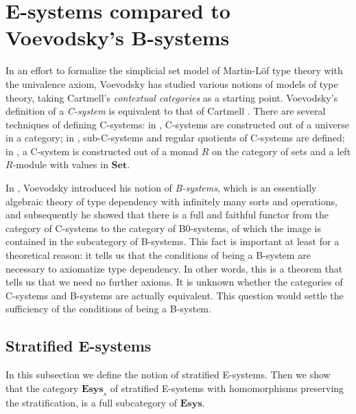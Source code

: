 \section{E-systems compared to Voevodsky's B-systems}\label{sec:esys_compared}
In an effort to formalize the simplicial set model of Martin-L\"of type theory
with the univalence axiom, Voevodsky has studied various notions of models of
type theory, taking Cartmell's \emph{contextual categories} as a starting
point. Voevodsky's definition of a \emph{C-system} is equivalent to that of Cartmell
\cite{VV_C-systems_quotients}. There are several techniques of defining 
C-systems: in \cite{VV_Csys_univ}, C-systems are constructed out of a universe
in a category; in \cite{VV_C-systems_quotients}, sub-C-systems and regular
quotients of C-systems are defined; in \cite{VV_C-systems_monad}, a C-system
is constructed out of a monad $R$ on the category of sets and a left $R$-module
with values in $\mathbf{Set}$. 

In \cite{VV_B-systems}, Voevodsky introduced his notion of \emph{B-systems}, which is
an essentially algebraic theory of type dependency with infinitely many sorts 
and operations, and subsequently he showed that there is a full and faithful
functor from the category of C-systems to the category of B0-systems, of which
the image is contained in the subcategory of B-systems. This fact is important at least
for a theoretical reason: it tells us that the conditions of being a B-system
are necessary to axiomatize type dependency. In other words,
this is a theorem that tells us that we need no further axioms. It is
unknown whether the categories of C-systems and B-systems are actually equivalent.
This question would settle the sufficiency of the conditions of being a B-system.

\subsection{Stratified E-systems}

In this subsection we define the notion of stratified E-systems. Then we show that the category $\mathbf{Esys}_s$ of stratified E-systems with homomorphisms preserving the stratification, is a full subcategory of $\mathbf{Esys}$. 


